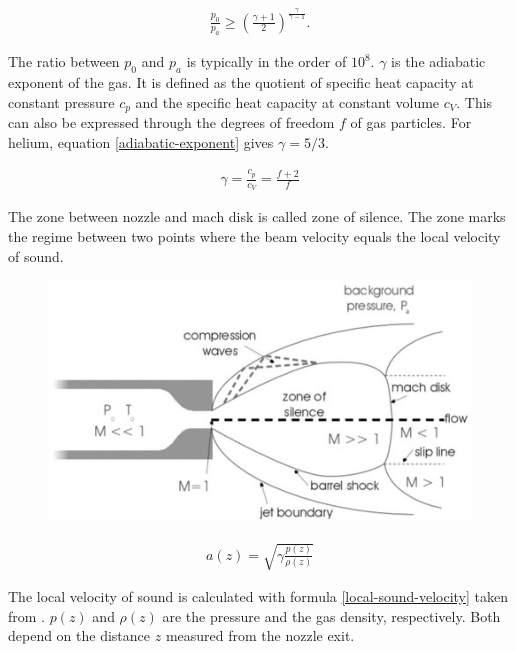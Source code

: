 \documentclass[parskip,12pt,headsepline,a4paper] {scrbook}
\begin{document}
\begin{align}  \label{pressure-condition}
\frac{p_0}{p_a} \geq \left(\frac{\gamma + 1}{2}\right)^{\frac{\gamma}{\gamma - 1}}.
\end{align}

The ratio between $p_0$ and $p_a$ is typically in the order of $10^8$. $\gamma$ is the adiabatic exponent of the gas. It is defined as the quotient of specific heat capacity at constant pressure $c_p$ and the specific heat capacity at constant volume $c_V$. This can also be expressed through the degrees of freedom $f$ of gas particles. For helium, equation \ref{adiabatic-exponent} gives $\gamma = 5/3$.

\begin{align}  \label{adiabatic-exponent}
\gamma = \frac{c_p}{c_V} = \frac{f+2}{f}
\end{align}

The zone between nozzle and mach disk is called zone of silence. The zone marks the regime between two points where the beam velocity equals the local velocity of sound.

\begin{figure}[ht]
\centerline{
\includegraphics[width=13cm]{./expansion/supersonic-expansion.jpg}}
\end{figure}

\begin{align}  \label{local-sound-velocity}
a(z) = \sqrt{\gamma \frac{p(z)}{\rho(z)}}
\end{align}

The local velocity of sound is calculated with formula \ref{local-sound-velocity} taken from \cite{scoles}. $p(z)$ and $\rho(z)$ are the pressure and the gas density, respectively. Both depend on the distance $z$ measured from the nozzle exit.
\end{document}
